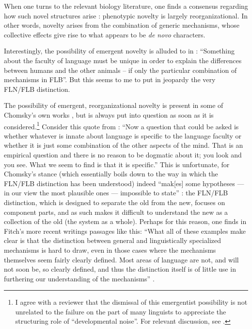 When one turns to the relevant biology literature, one finds a consensus regarding how such novel structures arise \citep{moczek2008origins,linz2019origins,prud2011body}: phenotypic novelty is largely reorganizational. In other words, novelty arises from the combination of generic mechanisms, whose collective effects give rise to what appears to be \textit{de novo} characters.

Interestingly, the possibility of emergent novelty is alluded to in \cite{fitch2005evolution}: ``Something about the faculty of language must be unique in order to explain the differences between humans and the other animals -- if only the particular combination of mechanisms in FLB''. But this seems to me to put in jeopardy the very FLN/FLB distinction.

\largerpage[-1]
The possibility of emergent, reorganizational novelty is present in some of Chomsky’s own works \citep{chomsky2005rules,chomsky2000new,chomsky2004beyond}, but is always put into question as soon as it is considered.\footnote{I agree with a reviewer that the dismissal of this emergentist possibility is not unrelated to the failure on the part of many linguists to appreciate the structuring role of ``developmental noise''. For relevant discussion, see \cite{lewontin2001triple,mitchell2018innate}.} Consider this quote from \cite{chomsky2005rules}: ``Now a question that could be asked is whether whatever is innate about language is specific to the language faculty or whether it is just some combination of the other aspects of the mind. That is an empirical question and there is no reason to be dogmatic about it; you look and you see. What we seem to find is that it is specific.'' This is unfortunate, for Chomsky’s stance (which essentially boils down to the way in which the FLN/FLB distinction has been understood) indeed ``mak[es] some hypotheses — in our view the most plausible ones — impossible to state'' \citep{jackendoff2005nature}: the FLN/FLB distinction, which is designed to separate the old from the new, focuses on component parts, and as such makes it difficult to understand the new as a collection of the old (the system as a whole). Perhaps for this reason, one finds in Fitch's more recent writings passages like this: ``What all of these examples make clear is that the distinction between general and linguistically specialized mechanisms is hard to draw, even in those cases where the mechanisms themselves seem fairly clearly defined. Most areas of language are not, and will not soon be, so clearly defined, and thus the distinction itself is of little use in furthering our understanding of the mechanisms''
\citep{fitch2011unity}.

